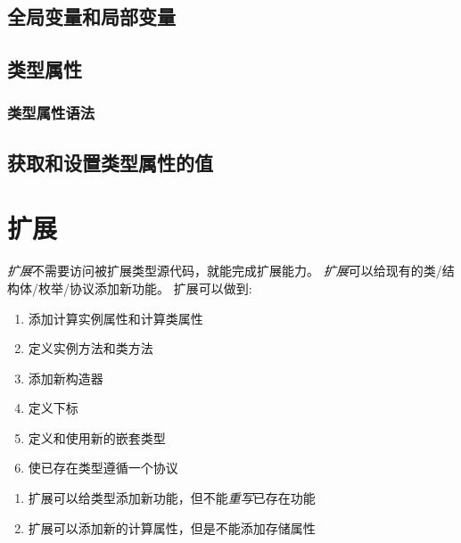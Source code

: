 \documentclass{../main.tex}{subfiles}
\begin{document}
\subsection{全局变量和局部变量}
\subsection{类型属性}
\subsubsection{类型属性语法}
\subsection{获取和设置类型属性的值}

\section{扩展}
\emph{扩展}不需要访问被扩展类型源代码，就能完成扩展能力。
\emph{扩展}可以给现有的类/结构体/枚举/协议添加新功能。
扩展可以做到:
\begin{enumerate}[itemsep=0pt, parsep=0pt, topsep=0pt, partopsep=0pt]
  \item 添加计算实例属性和计算类属性
  \item 定义实例方法和类方法
  \item 添加新构造器
  \item 定义下标
  \item 定义和使用新的嵌套类型
  \item 使已存在类型遵循一个协议
\end{enumerate}
\begin{artCaution}
  \begin{enumerate}[itemsep=0pt, parsep=0pt, topsep=0pt, partopsep=0pt]
    \item 扩展可以给类型添加新功能，但不能\emph{重写}已存在功能
    \item 扩展可以添加新的计算属性，但是不能添加存储属性
  \end{enumerate}
\end{artCaution}



\end{document}
